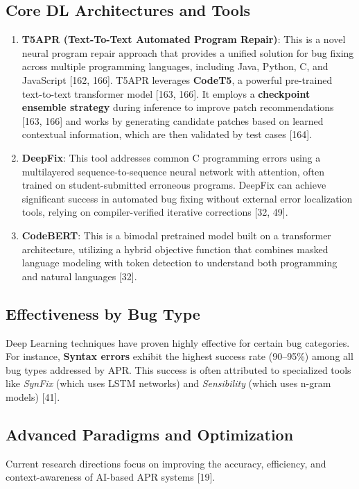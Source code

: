 \subsection{Core DL Architectures and Tools}
\begin{enumerate}
    \item \textbf{T5APR (Text-To-Text Automated Program Repair)}: This is a novel neural program repair approach that provides a unified solution for bug fixing across multiple programming languages, including Java, Python, C, and JavaScript [162, 166]. T5APR leverages \textbf{CodeT5}, a powerful pre-trained text-to-text transformer model [163, 166]. It employs a \textbf{checkpoint ensemble strategy} during inference to improve patch recommendations [163, 166] and works by generating candidate patches based on learned contextual information, which are then validated by test cases [164].
    \item \textbf{DeepFix}: This tool addresses common C programming errors using a multilayered sequence-to-sequence neural network with attention, often trained on student-submitted erroneous programs. DeepFix can achieve significant success in automated bug fixing without external error localization tools, relying on compiler-verified iterative corrections [32, 49].
    \item \textbf{CodeBERT}: This is a bimodal pretrained model built on a transformer architecture, utilizing a hybrid objective function that combines masked language modeling with token detection to understand both programming and natural languages [32].
\end{enumerate}

\subsection{Effectiveness by Bug Type}
Deep Learning techniques have proven highly effective for certain bug categories. For instance, \textbf{Syntax errors} exhibit the highest success rate (90–95\%) among all bug types addressed by APR. This success is often attributed to specialized tools like \emph{SynFix} (which uses LSTM networks) and \emph{Sensibility} (which uses n-gram models) [41].

\subsection{Advanced Paradigms and Optimization}

Current research directions focus on improving the accuracy, efficiency, and context-awareness of AI-based APR systems [19].


